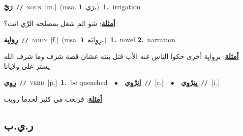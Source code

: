 \documentclass[10pt,a4paper,twoside]{article} %
\begin{document}
\begin{multicols}{2}
{\setlength\topsep{0pt}\textbf{\foreignlanguage{arabic}{رَيّ}}\ {\color{gray}\texttt{//}\color{black}}\ \textsc{noun}\ [m.]\ \color{gray}(msa. \foreignlanguage{arabic}{رَي}~\foreignlanguage{arabic}{\textbf{١.}})\color{black}\ \textbf{1.}~irrigation\  \begin{flushright}\color{gray}\foreignlanguage{arabic}{\textbf{\underline{\foreignlanguage{arabic}{أمثلة}}}: شو الم شغل بمصلحة الرَّي انت؟}\end{flushright}\color{black}} \vspace{2mm}

{\setlength\topsep{0pt}\textbf{\foreignlanguage{arabic}{رِوَايِة}}\ {\color{gray}\texttt{//}\color{black}}\ \textsc{noun}\ [f.]\ \color{gray}(msa. \foreignlanguage{arabic}{رِوِايَة}~\foreignlanguage{arabic}{\textbf{١.}})\color{black}\ \textbf{1.}~novel  \textbf{2.}~narration\  \begin{flushright}\color{gray}\foreignlanguage{arabic}{\textbf{\underline{\foreignlanguage{arabic}{أمثلة}}}: برِوِايِة أخرى حكوا الناس غنه الأب قتل بنته عشان قصة شرف وما شرف الله يستر على ولايانا}\end{flushright}\color{black}} \vspace{2mm}

{\setlength\topsep{0pt}\textbf{\foreignlanguage{arabic}{رِوِي}}\ {\color{gray}\texttt{//}\color{black}}\ \textsc{verb}\ [p.]\ \textbf{1.}~be quenched\ \ $\bullet$\ \ \setlength\topsep{0pt}\textbf{\foreignlanguage{arabic}{اِنِرْوِي}}\ {\color{gray}\texttt{//}\color{black}}\ [c.]\ \ $\bullet$\ \ \setlength\topsep{0pt}\textbf{\foreignlanguage{arabic}{يِنِرْوِي}}\ {\color{gray}\texttt{//}\color{black}}\ [i.]\  \begin{flushright}\color{gray}\foreignlanguage{arabic}{\textbf{\underline{\foreignlanguage{arabic}{أمثلة}}}: قربعت مي كثير لحدما رويت}\end{flushright}\color{black}} \vspace{2mm}

\vspace{-3mm}
\subsection*{\color{blue}\foreignlanguage{arabic}{ر.ي.ب}\color{blue}{}} 


\end{multicols}
\end{document}
